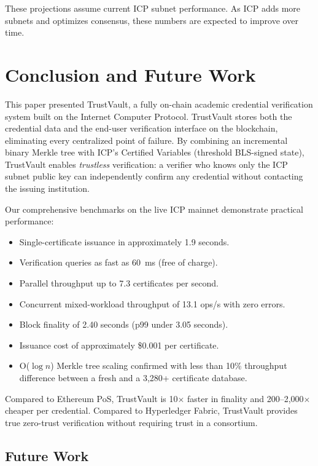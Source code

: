 \documentclass[journal]{IEEEtran}
\begin{document}
These projections assume current ICP subnet performance. As ICP adds more subnets and optimizes consensus, these numbers are expected to improve over time.

\section{Conclusion and Future Work}
\label{sec:conclusion}

This paper presented TrustVault, a fully on-chain academic credential verification system built on the Internet Computer Protocol. TrustVault stores both the credential data and the end-user verification interface on the blockchain, eliminating every centralized point of failure. By combining an incremental binary Merkle tree with ICP's Certified Variables (threshold BLS-signed state), TrustVault enables \emph{trustless} verification: a verifier who knows only the ICP subnet public key can independently confirm any credential without contacting the issuing institution.

Our comprehensive benchmarks on the live ICP mainnet demonstrate practical performance:
\begin{itemize}[leftmargin=*]
  \item Single-certificate issuance in approximately 1.9 seconds.
  \item Verification queries as fast as 60~ms (free of charge).
  \item Parallel throughput up to 7.3 certificates per second.
  \item Concurrent mixed-workload throughput of 13.1 ops/s with zero errors.
  \item Block finality of 2.40 seconds (p99 under 3.05 seconds).
  \item Issuance cost of approximately \$0.001 per certificate.
  \item O($\log n$) Merkle tree scaling confirmed with less than 10\% throughput difference between a fresh and a 3,280+ certificate database.
\end{itemize}

Compared to Ethereum PoS, TrustVault is 10$\times$ faster in finality and 200--2{,}000$\times$ cheaper per credential. Compared to Hyperledger Fabric, TrustVault provides true zero-trust verification without requiring trust in a consortium.

\subsection{Future Work}
\end{document}
